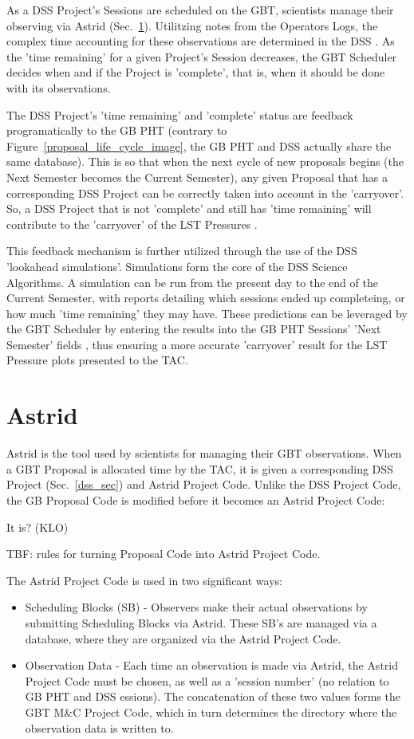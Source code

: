 \documentclass{article}
\begin{document}
As a DSS Project's Sessions are scheduled on the GBT, scientists manage their observing via Astrid (Sec.~\ref{astrid_sec}).  Utilitzing notes from the Operators Logs, the complex time accounting for these observations are determined in the DSS \cite{}.  As the 'time remaining' for a given Project's Session decreases, the GBT Scheduler decides when and if the Project is 'complete', that is, when it should be done with its observations.

The DSS Project's 'time remaining' and 'complete' status are feedback
programatically to the GB PHT (contrary to Figure~\ref{proposal_life_cycle_image}, the GB PHT and DSS actually share the same database).  This is so that when the next cycle of new
proposals begins (the Next Semester becomes the Current Semester), any given
Proposal that has a corresponding DSS Project can be correctly taken into
account in the 'carryover'.  So, a DSS Project that is not 'complete' and
still has 'time remaining' will contribute to the 'carryover' of the LST
Pressures \cite{marganian12b}.

This feedback mechanism is further utilized through the use of the DSS
'lookahead simulations'.  Simulations form the core of the DSS Science
Algorithms.  A simulation can be run from the present day to the end of the
Current Semester, with reports detailing which sessions ended up completeing,
or how much 'time remaining' they may have.  These predictions can be leveraged by the GBT Scheduler by entering the results into the GB PHT Sessions' 'Next Semester' fields \cite{marganian12a}, thus ensuring a more accurate 'carryover' result for the LST Pressure plots presented to the TAC.

\section{Astrid}\label{astrid_sec}

Astrid is the tool used by scientists for managing their GBT observations.
When a GBT Proposal is allocated time by the TAC, it is given a corresponding
DSS Project (Sec.~\ref{dss_sec}) and Astrid Project Code. Unlike the DSS Project
Code, the GB Proposal Code is modified before it becomes an Astrid Project
Code:

It is? (KLO)

TBF: rules for turning Proposal Code into Astrid Project Code.

The Astrid Project Code is used in two significant ways:

\begin{itemize}
\item Scheduling Blocks (SB) - Observers make their actual observations by
submitting Scheduling Blocks via Astrid.  These SB's are managed via a
database, where they are organized via the Astrid Project Code.
\item Observation Data - Each time an observation is made via Astrid, the
Astrid Project Code must be chosen, as well as a 'session number' (no relation
to GB PHT and DSS essions).  The concatenation of these two values forms the
GBT M\&C Project Code, which in turn determines the directory where the
observation data is written to.
\end{itemize}
\end{document}
